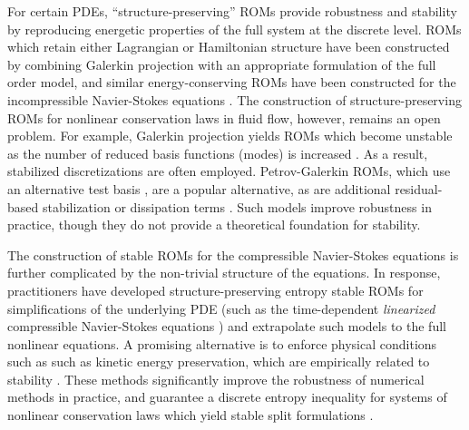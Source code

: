 \documentclass[preprint,10pt]{elsarticle}
\theoremstyle{definition}
\theoremstyle{lemma}
\theoremstyle{theorem}
\theoremstyle{assumption}
\begin{document}
For certain PDEs, ``structure-preserving'' ROMs provide robustness and stability by reproducing energetic properties of the full system at the discrete level.  ROMs which retain either Lagrangian \cite{lall2003structure, carlberg2015preserving} or Hamiltonian structure \cite{benner2012interpolation, gugercin2012structure, peng2016symplectic, chaturantabut2016structure, gong2017structure, afkham2017structure, afkham2018structure} have been constructed by combining Galerkin projection with an appropriate formulation of the full order model, and similar energy-conserving ROMs have been constructed for the incompressible Navier-Stokes equations \cite{farhat2014dimensional, farhat2015structure}.  The construction of structure-preserving ROMs for nonlinear conservation laws in fluid flow, however, remains an open problem.  For example, Galerkin projection yields ROMs which become unstable as the number of reduced basis functions (modes) is increased \cite{bui2007goal, carlberg2013gnat}.  As a result, stabilized discretizations are often employed.  Petrov-Galerkin ROMs, which use an alternative test basis \cite{maday2002blackbox, rozza2007stability, bui2007goal, serre2012reliable, amsallem2012stabilization, rozza2013reduced, ballarin2015supremizer, carlberg2017galerkin}, are a popular alternative, as are additional residual-based stabilization or dissipation terms \cite{wang2012proper, kalashnikova2014stabilization, caiazzo2014numerical, balajewicz2016minimal}.  Such models improve robustness in practice, though they do not provide a theoretical foundation for stability.  

The construction of stable ROMs for the compressible Navier-Stokes equations is further complicated by the non-trivial structure of the equations.  In response, practitioners have developed structure-preserving entropy stable ROMs for simplifications of the underlying PDE (such as the time-dependent \textit{linearized} compressible Navier-Stokes equations \cite{barone2009stable, kalashnikova2010stability, amsallem2012stabilization, kalashnikova2014construction}) and extrapolate such models to the full nonlinear equations.  A promising alternative is to enforce physical conditions such as such as kinetic energy preservation, which are empirically related to stability \cite{maboudi2018conservative}.  These methods significantly improve the robustness of numerical methods in practice, and guarantee a discrete entropy inequality for systems of nonlinear conservation laws which yield stable split formulations \cite{fisher2013discretely}.  
\end{document}
